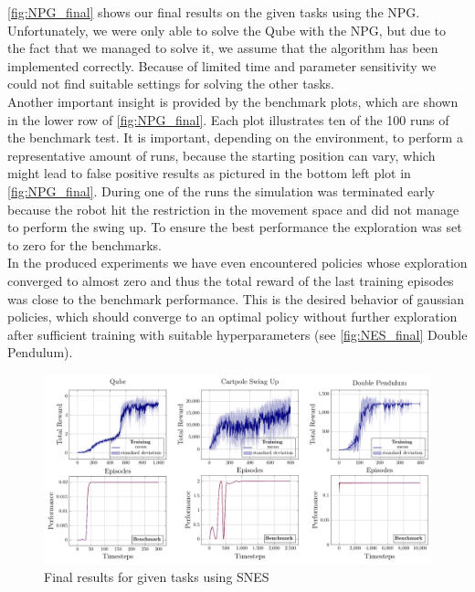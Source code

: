 \autoref{fig:NPG_final} shows our final results on the given tasks using the NPG. Unfortunately, we were only able to solve the Qube with the NPG, but due to the fact that we managed to solve it, we assume that the algorithm has been implemented correctly. Because of limited time and parameter sensitivity we could not find suitable settings for solving the other tasks. \\
Another important insight is provided by the benchmark plots, which are shown in the lower row of \autoref{fig:NPG_final}. Each plot illustrates ten of the 100 runs of the benchmark test. It is important, depending on the environment, to perform a representative amount of runs, because the starting position can vary, which might lead to false positive results as pictured in the bottom left plot in \autoref{fig:NPG_final}. During one of the runs the simulation was terminated early because the robot hit the restriction in the movement space and did not manage to perform the swing up. To ensure the best performance the exploration was set to zero for the benchmarks. \\
In the produced experiments we have even encountered policies whose exploration converged to almost zero and thus the total reward of the last training episodes was close to the benchmark performance. This is the desired behavior of gaussian policies, which should converge to an optimal policy without further exploration after sufficient training with suitable hyperparameters (see \autoref{fig:NES_final} Double Pendulum). \\

\begin{figure}
\centering
\includegraphics[width=\textwidth]{plots/learned_benchmarked_NES.pdf}
\caption{Final results for given tasks using SNES}
\label{fig:NES_final}
\end{figure}

